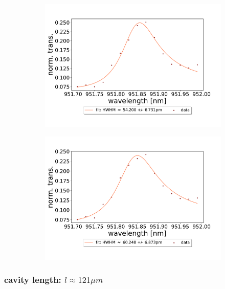 \begin{figure}[h!]
\begin{subfigure}[b]{0.49\textwidth}
        \includegraphics[width=\textwidth]{figures/results/double fano fits/250um_M3:M5_fit_5.pdf}
        \caption{}
        \label{fig:250um_M3:M5_fit_5}
    \end{subfigure}
    \begin{subfigure}[b]{0.49\textwidth}
        \includegraphics[width=\textwidth]{figures/results/double fano fits/250um_M3:M5_fit_6.pdf}
        \caption{}
        \label{fig:250um_M3:M5_fit_6}
    \end{subfigure}
\end{figure}

\clearpage
\subsubsection*{cavity length: $l \approx 121 \mu m$}

